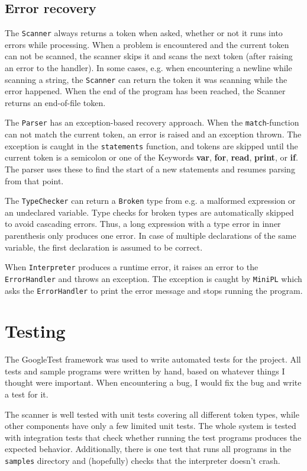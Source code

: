 \documentclass[a4paper]{article}
\newcommand*{\code}[1]{\texttt{#1}}
\begin{document}
\subsection{Error recovery}

The \code{Scanner} always returns a token when asked, whether or 
not it runs into errors while processing. When a problem is 
encountered and the current token can not be scanned, the scanner 
skips it and scans the next token (after raising an error to the 
handler). In some cases, e.g. when encountering a newline while 
scanning a string, the \code{Scanner} can return the token it 
was scanning while the error happened. When the end of the 
program has been reached, the Scanner returns an end-of-file token.

The \code{Parser} has an exception-based recovery approach. When the 
\code{match}-function can not match the current token, an error 
is raised and an exception thrown. The exception is caught 
in the \code{statements} function, and tokens are skipped until
the current token is a semicolon or one of the Keywords 
\textbf{var}, \textbf{for}, \textbf{read}, \textbf{print}, 
or \textbf{if}. The parser uses these to find the start of a 
new statements and resumes parsing from that point.


The \code{TypeChecker} can return a \code{Broken} type from e.g.
a malformed expression or an undeclared variable. Type checks 
for broken types are automatically skipped to avoid cascading 
errors. Thus, a long expression with a type error in inner 
parenthesis only produces one error. In case of multiple 
declarations of the same variable, the first declaration is 
assumed to be correct.

When \code{Interpreter} produces a runtime error, it 
raises an error to the \code{ErrorHandler} and throws an exception. 
The exception is caught by \code{MiniPL} which asks the 
\code{ErrorHandler} to print the error message and stops running the 
program.

\section{Testing}

The GoogleTest framework was used to write automated 
tests for the project. All tests and sample programs were written 
by hand, based on whatever 
things I thought were important. When encountering a bug, I would 
fix the bug and write a test for it. 


The scanner is well tested with unit tests 
covering all different token types, while other components have 
only a few limited unit tests. The whole system is tested with 
integration tests that check whether running the test programs 
produces the expected behavior. Additionally, there is one 
test that runs all programs in the \code{samples} directory 
and (hopefully) checks that the interpreter doesn't crash.
\end{document}
